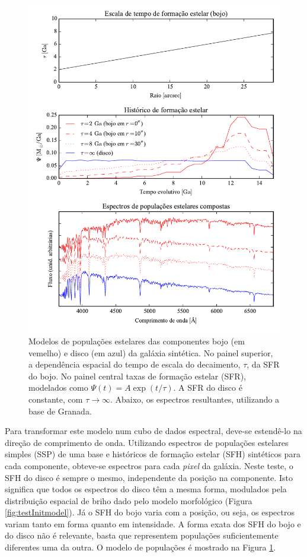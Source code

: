 \begin{figure}
	\includegraphics{figuras/simulation_popmodel}
	\caption[Modelos de populações estelares da galáxia sintética.]
	{Modelos de populações estelares das componentes bojo (em vemelho)
	e disco (em azul) da galáxia sintética. No painel superior, a dependência
	espacial do tempo de escala do decaimento, $\tau$, da SFR do bojo. No painel
	central taxas de formação estelar (SFR), modelados como $\Psi(t) = A \exp
	(t/\tau)$. A SFR do disco é constante, com $\tau\to\infty$. Abaixo, os
	espectros resultantes, utilizando a base de Granada.}
	\label{fig:testPopmodel}
\end{figure}

Para transformar este modelo num cubo de dados espectral, deve-se estendê-lo na
direção de comprimento de onda. Utilizando espectros de populações estelares
simples (SSP) de uma base e históricos de formação estelar (SFH) sintéticos
para cada componente, obteve-se espectros para cada {\em pixel} da galáxia. Neste
teste, o SFH do disco é sempre o mesmo, independente da posição na componente.
Isto significa que todos os espectros do disco têm a mesma forma, modulados pela
distribuição espacial de briho dado pelo modelo morfológico (Figura
\ref{fig:testInitmodel}). Já o SFH do bojo varia com a posição, ou seja, os
espectros variam tanto em forma quanto em intensidade. A forma exata dos SFH do
bojo e do disco não é relevante, basta que representem populações
suficientemente diferentes uma da outra. O modelo de populações é mostrado na
Figura \ref{fig:testPopmodel}.

